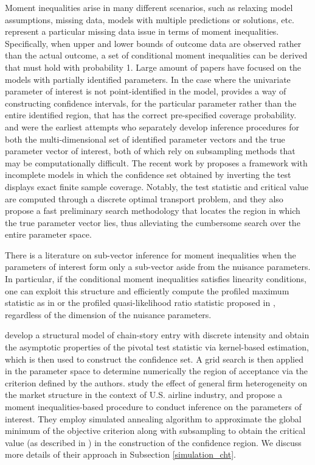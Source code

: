 \documentclass[12pt]{article}
\theoremstyle{definition}
\begin{document}
Moment inequalities arise in many different scenarios, such as relaxing model assumptions, missing data, models with multiple predictions or solutions, etc. \cite{manski_tamer} represent a particular missing data issue in terms of moment inequalities. Specifically, when upper and lower bounds of outcome data are observed rather than the actual outcome, a set of conditional moment inequalities can be derived that must hold with probability 1. Large amount of papers have focused on the models with partially identified parameters. In the case where the univariate parameter of interest is not point-identified in the model, \cite{imbens_manski} provides a way of constructing confidence intervals, for the particular parameter rather than the entire identified region, that has the correct pre-specified coverage probability. \cite{CHT2007} and \cite{Romano_Shaikh} were the earliest attempts who separately develop inference procedures for both the multi-dimensional set of identified parameter vectors and the true parameter vector of interest, both of which rely on subsampling methods that may be computationally difficult. The recent work by \cite{Li_Henry} proposes a framework with incomplete models in which the confidence set obtained by inverting the test displays exact finite sample coverage. Notably, the test statistic and critical value are computed through a discrete optimal transport problem, and they also propose a fast preliminary search methodology that locates the region in which the true parameter vector lies, thus alleviating the cumbersome search over the entire parameter space. 

There is a literature on sub-vector inference for moment inequalities when the parameters of interest form only a sub-vector aside from the nuisance parameters. In particular, if the conditional moment inequalities satisfies linearity conditions, one can exploit this structure and efficiently compute the profiled maximum statistic as in \cite{ARP2019} or the profiled quasi-likelihood ratio statistic proposed in \cite{cox_shi_2022}, regardless of the dimension of the nuisance parameters.

\cite{ALG-2016} develop a structural model of chain-story entry with discrete intensity and obtain the asymptotic properties of the pivotal test statistic via kernel-based estimation, which is then used to construct the confidence set. A grid search is then applied in the parameter space to determine numerically the region of acceptance via the criterion defined by the authors. \cite{Ciliberto_Tamer} study the effect of general firm heterogeneity on the market structure in the context of U.S. airline industry, and propose a moment inequalities-based procedure to conduct inference on the parameters of interest. They employ simulated annealing algorithm to approximate the global minimum of the objective criterion along with subsampling to obtain the critical value (as described in \cite{CHT2007}) in the construction of the confidence region. We discuss more details of their approach in Subsection \ref{simulation_cht}.
\end{document}
